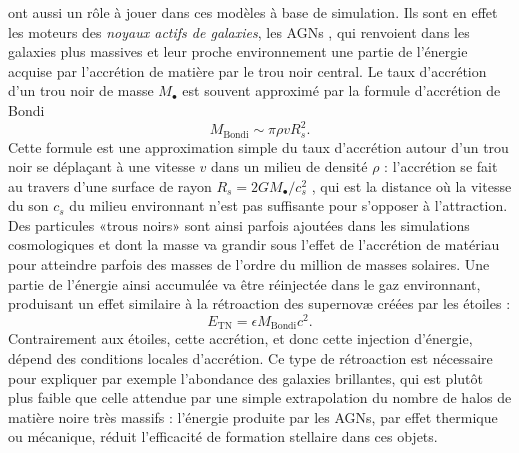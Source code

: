  ont aussi un rôle à jouer dans ces modèles à base de simulation. Ils sont en effet les moteurs des \textit{noyaux actifs de galaxies}, les AGNs , qui renvoient dans les galaxies plus massives et leur proche environnement une partie de l'énergie acquise par l'accrétion de matière par le trou noir central. Le taux d'accrétion d'un trou noir de masse $M_\bullet$ est souvent approximé par la formule d'accrétion de Bondi
\begin{equation}
M_\mathrm{Bondi}\sim \pi \rho v R_s^2.
\end{equation}
Cette formule est une approximation simple du taux d'accrétion autour d'un trou noir se déplaçant à une vitesse $v$ dans un milieu de densité $\rho$ : l'accrétion se fait au travers d'une surface de rayon $R_s=2GM_\bullet/c_s^2$ , qui est la distance où la vitesse du son $c_s$ du milieu environnant n'est pas suffisante pour s'opposer à l'attraction. Des particules «trous noirs» sont ainsi parfois ajoutées dans les simulations cosmologiques et dont la masse va grandir sous l'effet de l'accrétion de matériau pour atteindre parfois des masses de l'ordre du million de masses solaires. Une partie de l'énergie ainsi accumulée va être réinjectée dans le gaz environnant, produisant un effet similaire à la rétroaction des supernovæ créées par les étoiles :
\begin{equation}
E_{\mathrm{TN}}=\epsilon M_\mathrm{Bondi} c^2.
\end{equation}
Contrairement aux étoiles, cette accrétion, et donc cette injection d'énergie, dépend des conditions locales d'accrétion. Ce type de rétroaction est nécessaire pour expliquer par exemple l'abondance des galaxies brillantes, qui est plutôt plus faible que celle attendue par une simple extrapolation du nombre de halos de matière noire très massifs : l'énergie produite par les AGNs, par effet thermique ou mécanique, réduit l'efficacité de formation stellaire dans ces objets.

